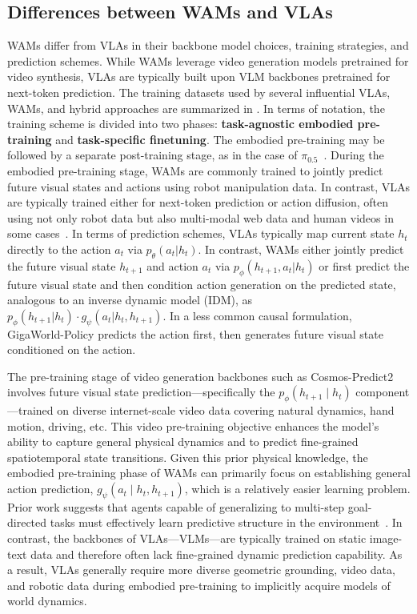 \documentclass{article}
\begin{document}
\subsection{Differences between WAMs and VLAs} \label{sec:diff_wam}

WAMs differ from VLAs in their backbone model choices, training strategies, and prediction schemes. While WAMs leverage video generation models pretrained for video synthesis, VLAs are typically built upon VLM backbones pretrained for next-token prediction. The training datasets used by several influential VLAs, WAMs, and hybrid approaches are summarized in . In terms of notation, the training scheme is divided into two phases: \textbf{task-agnostic embodied pre-training} and \textbf{task-specific finetuning}. The embodied pre-training may be followed by a separate post-training stage, as in the case of $\pi_{0.5}$~\citep{pi05}. During the embodied pre-training stage, WAMs are commonly trained to jointly predict future visual states and actions using robot manipulation data. In contrast, VLAs are typically trained either for next-token prediction or action diffusion, often using not only robot data but also multi-modal web data and human videos in some cases~\citep{pi05, BuQ-RSS-25}. In terms of prediction schemes, VLAs typically map current state $h_t$ directly to the action $a_t$ via $p_\theta(a_t | h_t)$. In contrast, WAMs either jointly predict the future visual state $h_{t+1}$ and action $a_t$ via $p_\phi(h_{t+1}, a_t | h_t)$ or first predict the future visual state and then condition action generation on the predicted state, analogous to an inverse dynamic model (IDM), as $p_\phi(h_{t+1} | h_t) \cdot g_\psi(a_t | h_t, h_{t+1})$. In a less common causal formulation, GigaWorld-Policy predicts the action first, then generates future visual state conditioned on the action.

The pre-training stage of video generation backbones such as Cosmos-Predict2 involves future visual state prediction—specifically the $p_\phi(h_{t+1} \mid h_t)$ component—trained on diverse internet-scale video data covering natural dynamics, hand motion, driving, etc. This video pre-training objective enhances the model's ability to capture general physical dynamics and to predict fine-grained spatiotemporal state transitions. Given this prior physical knowledge, the embodied pre-training phase of WAMs can primarily focus on establishing general action prediction, $g_\psi(a_t \mid h_t, h_{t+1})$, which is a relatively easier learning problem. Prior work suggests that agents capable of generalizing to multi-step goal-directed tasks must effectively learn predictive structure in the environment~\citep{richens2025general}. In contrast, the backbones of VLAs---VLMs---are typically trained on static image-text data and therefore often lack fine-grained dynamic prediction capability. As a result, VLAs generally require more diverse geometric grounding, video data, and robotic data during embodied pre-training to implicitly acquire models of world dynamics.
\end{document}
